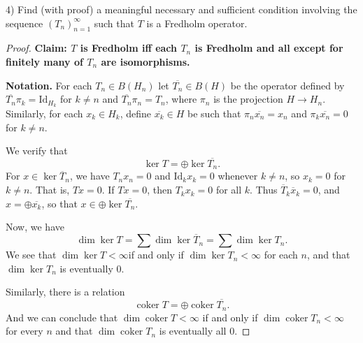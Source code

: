 \begin{problem}
	4) Find (with proof) a meaningful necessary and sufficient condition involving the sequence $\left(T_n\right)_{n=1}^{\infty}$ such that $T$ is a Fredholm operator.
\end{problem}
\begin{proof}
	\textbf{Claim: $T$ is Fredholm iff each $T_n$ is Fredholm and all except for finitely many of $T_n$ are isomorphisms.}

	\textbf{Notation. }For each $T_n \in B(H_n)$ let $\overline{T_n}  \in B(H)$ be the operator defined by  $\overline{T_n}\pi_k  = \text{Id}_{H_k}$ for $k \neq n$ and $\overline{T_n}\pi_n  = T_n$, where $\pi_n$ is the projection $H \to H_n$. Similarly, for each $x_k \in H_k$, define $\overline{x_k} \in H$ be such that $\pi_n \overline{x_n}  = x_n$ and $\pi_k \overline{x_n}  = 0$ for $k \neq n$. 

	We verify that
	\[
		\operatorname{ker} T = \oplus \operatorname{ker} \overline{T_n}
	.\] 
	For $x \in \operatorname{ker} \overline{T} _n$, we have $T_n x_n = 0$ and  $\text{Id}_k x_k = 0$ whenever $k \neq n$, so $x_k = 0$ for $k \neq n$. That is, $T x = 0$.
	If $T x = 0$, then $T_k x_k = 0$ for all $k$. Thus $\overline{T} _k \overline{x} _k = 0$, and $x = \oplus \overline{x_k} $, so that $x \in \oplus \operatorname{ker} \overline{T_n} $.


	Now, we have
	\[
		\operatorname{dim} \operatorname{ker} T = \sum \operatorname{dim} \operatorname{ker} \overline{T} _n = \sum \operatorname{dim} \operatorname{ker} T_n
	.\] 
	We see that $\operatorname{dim} \operatorname{ker} T< \infty $if and only if $\operatorname{dim} \operatorname{ker} T_n < \infty $ for each $n$, and that $\operatorname{dim} \operatorname{ker} T_n$ is eventually $0$.

	Similarly, there is a relation
	\[
		\operatorname{coker} T = \oplus \operatorname{coker} \overline{T_n} 
	.\] 
	And we can conclude that $\operatorname{dim} \operatorname{coker} T < \infty $ if and only if $\operatorname{dim} \operatorname{coker} T_n < \infty $ for every $n$ and that $\operatorname{dim} \operatorname{coker} T_n$ is eventually all $0$.
	
\end{proof}

